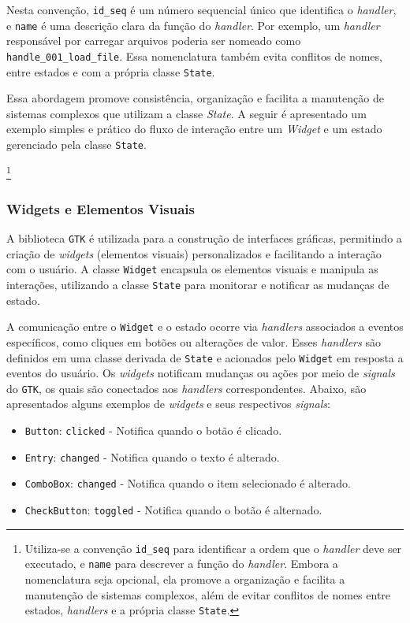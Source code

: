 Nesta convenção, \texttt{id\_seq} é um número sequencial único que identifica o \textit{handler}, e \texttt{name} é uma descrição clara da função do \textit{handler}. Por exemplo, um \textit{handler} responsável por carregar arquivos poderia ser nomeado como \texttt{handle\_001\_load\_file}. Essa nomenclatura também evita conflitos de nomes, entre estados e com a própria classe \texttt{State}.

Essa abordagem promove consistência, organização e facilita a manutenção de sistemas complexos que utilizam a classe \textit{State}. A seguir é apresentado um exemplo simples e prático do fluxo de interação entre um \textit{Widget} e um estado gerenciado pela classe \texttt{State}.

\footnote{Utiliza-se a convenção \texttt{id\_seq} para identificar a ordem que o \textit{handler} deve ser executado, e \texttt{name} para descrever a função do \textit{handler}. Embora a nomenclatura seja opcional, ela promove a organização e facilita a manutenção de sistemas complexos, além de evitar conflitos de nomes entre estados, \textit{handlers} e a própria classe \texttt{State}.}

\subsubsection{Widgets e Elementos Visuais}

A biblioteca \texttt{GTK} é utilizada para a construção de interfaces gráficas, permitindo a criação de \textit{widgets} (elementos visuais) personalizados e facilitando a interação com o usuário. A classe \texttt{Widget} encapsula os elementos visuais e manipula as interações, utilizando a classe \texttt{State} para monitorar e notificar as mudanças de estado.

A comunicação entre o \texttt{Widget} e o estado ocorre via \textit{handlers} associados a eventos específicos, como cliques em botões ou alterações de valor. Esses \textit{handlers} são definidos em uma classe derivada de \texttt{State} e acionados pelo \texttt{Widget} em resposta a eventos do usuário. Os \textit{widgets} notificam mudanças ou ações por meio de \textit{signals} do \texttt{GTK}, os quais são conectados aos \textit{handlers} correspondentes. Abaixo, são apresentados alguns exemplos de \textit{widgets} e seus respectivos \textit{signals}:

\begin{itemize}
    \item \texttt{Button}: \texttt{clicked} - Notifica quando o botão é clicado.
    \item \texttt{Entry}: \texttt{changed} - Notifica quando o texto é alterado.
    \item \texttt{ComboBox}: \texttt{changed} - Notifica quando o item selecionado é alterado.
    \item \texttt{CheckButton}: \texttt{toggled} - Notifica quando o botão é alternado.
\end{itemize}

